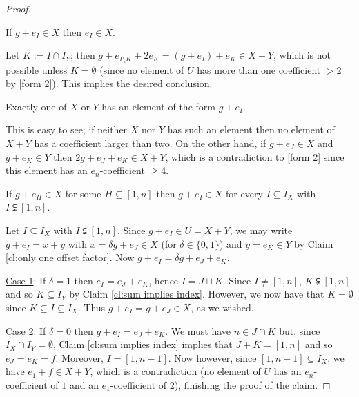 \begin{proof}
	\begin{claim} \label{cl:offset sum implies sum}
	If $g + e_I\in X$ then $e_I\in X$. 
	\end{claim}
	
	Let $K := I\cap I_Y$; then $g + e_{I\setminus K} + 2e_K = (g+e_I) + e_K \in X+Y$, which is not possible unless $K=\emptyset$ (since no element of $U$ has more than one coefficient $>2$ by \ref{form 2}).
	This implies the desired conclusion.
	
	\begin{claim} \label{cl:only one offset factor}
	Exactly one of $X$ or $Y$ has an element of the form $g + e_I$. 
	\end{claim}
	
	This is easy to see; if neither $X$ nor $Y$ has such an element then no element of $X+Y$ has a coefficient larger than two.
	On the other hand, if $g+e_J\in X$ and $g+e_K\in Y$ then $2g + e_J + e_K \in X+Y$, which is a contradiction to \ref{form 2} since this element has an $e_n$-coefficient $\ge 4$.
	
	\begin{claim} \label{cl:one offset sum implies all}
	If $g+ e_H\in X$ for some $H\subseteq [ 1,n ]$ then $g + e_I \in X$ for every $I\subseteq I_X$ with $I\subsetneqq [ 1,n]$. 
	\end{claim}
	
	Let $I \subseteq I_X$ with $I\subsetneqq [1,n]$.
	Since $g+e_I\in U = X+Y$, we may write $g+e_I = x +y$ with $x = \delta g + e_J\in X$ (for $\delta\in \{0,1\}$) and $y=e_K\in Y$ by Claim \ref{cl:only one offset factor}.
	Now $g + e_I = \delta g + e_J + e_K$.
	
	\underline{Case 1}: If $\delta = 1$ then $e_I = e_J + e_K$, hence $I = J\sqcup K$. 
	Since $I\neq [1,n]$, $K\subsetneqq [ 1,n ]$ and so $K\subseteq I_Y$ by Claim \ref{cl:sum implies index}.
	However, we now have that $K = \emptyset$ since $K\subseteq I \subseteq I_X$.
	Thus $g + e_I = g + e_J \in X$, as we wished.
	
	\underline{Case 2}: 
	If $\delta=0$ then $g + e_I = e_J + e_K$.
	We must have $n\in J\cap K$ but, since $I_X\cap I_Y = \emptyset$, Claim \ref{cl:sum implies index} implies that $J+K=[1,n]$ and so $e_J = e_K = f$.
	Moreover, $I = [1,n-1]$.
	Now however, since $[ 1,n-1 ] \subseteq I_X$, we have $e_1 + f \in X+Y$, which is a contradiction (no element of $U$ has an $e_n$-coefficient of $1$ and an $e_1$-coefficient of $2$), finishing the proof of the claim.


\end{proof}
